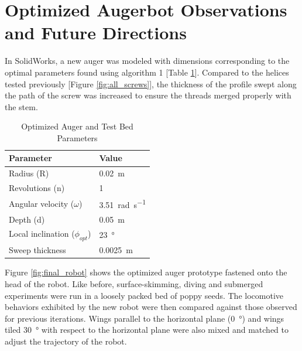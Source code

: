 \documentclass[letterpaper, 11 pt]{article}
\begin{document}
\section{Optimized Augerbot Observations and Future Directions}
In SolidWorks, a new auger was modeled with dimensions corresponding to the optimal parameters found using algorithm 1 [Table \ref{optParamTable}]. Compared to the helices tested previously [Figure \ref{fig:all_screws}], the thickness of the profile swept along the path of the screw was increased to ensure the threads merged properly with the stem.   

\begin{table}[H] 
\centering
\caption{Optimized Auger and Test Bed Parameters}
	\begin{tabular}{l | l}
	\textbf{Parameter} & \textbf{Value} \\
	\hline
	Radius (R) & \SI{0.02}{\m} \\
	Revolutions (n) & 1 \\
	Angular velocity ($\omega$) & \SI{3.51}{\radian\per\s} \\
	Depth (d) & \SI{0.05}{\m}\\  
	Local inclination ($\phi_{opt}$) & \SI{23}{\degree}\\
	Sweep thickness & \SI{0.0025}{\m}
	\end{tabular}
	\label{optParamTable}
\end{table}

\medskip
Figure \ref{fig:final_robot} shows the optimized auger prototype fastened onto the head of the robot. Like before, surface-skimming, diving and submerged experiments were run in a loosely packed bed of poppy seeds. The locomotive behaviors exhibited by the new robot were then compared against those observed for previous iterations. Wings parallel to the horizontal plane (\SI{0}{\degree}) and wings tiled \SI{30}{\degree} with respect to the horizontal plane were also mixed and matched to adjust the trajectory of the robot.  
\end{document}
